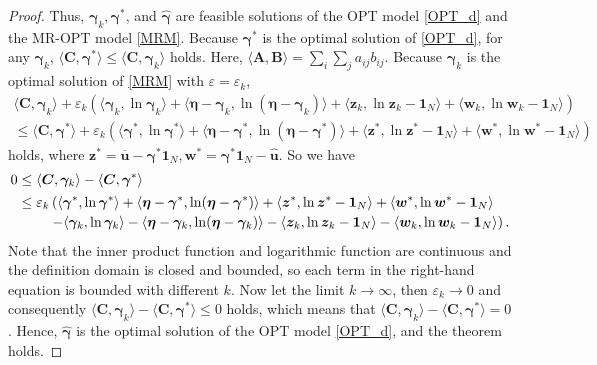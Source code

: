 \documentclass[10pt,a4paper]{amsart}
\begin{document}
\begin{proof}
 Thus, $\bm{\gamma}_{k}, \bm{\gamma}^*$, and $\hat{\bm{\gamma}}$ are feasible solutions of the OPT model \cref{OPT_d} and the MR-OPT model \cref{MRM}. Because $\bm{\gamma}^*$ is the optimal solution of  \cref{OPT_d}, for any $\bm{\gamma}_k$, $\langle \bm{C}, \bm{\gamma}^*\rangle \leq \langle \bm{C}, \bm{\gamma}_k \rangle$ holds. Here, $\langle \bm{A}, \bm{B} \rangle = \sum_i \sum_j a_{ij} b_{ij}$. 
 Because $\bm{\gamma}_k$ is the optimal solution of  \cref{MRM} with $\varepsilon=\varepsilon_k$, 
 \begin{multline*}
     \langle \bm{C}, \bm{\gamma}_k\rangle \! +\! \varepsilon_k(\langle \bm{\gamma}_k, \ln \bm{\gamma}_k \rangle\! +\!  \langle \bm{\eta}-\bm{\gamma}_k, \ln (\bm{\eta}-\bm{\gamma}_k) \rangle  
    \! +\! \langle \bm{z}_k, \ln \bm{z}_k -\bm{1}_N \rangle\! +\!  \langle \bm{w}_k, \ln \bm{w}_k -\bm{1}_N \rangle) \\
     \leq \langle \bm{C}, \bm{\gamma}^* \rangle\!  +\! \varepsilon_k(\langle \bm{\gamma}^*, \ln \bm{\gamma}^* \rangle\! +\! \langle \bm{\eta}-\bm{\gamma}^*, \ln (\bm{\eta}-\bm{\gamma}^*) \rangle  
     \! +\! \langle \bm{z}^*, \ln \bm{z}^* -\bm{1}_N \rangle\! +\! \langle \bm{w}^*, \ln \bm{w}^* -\bm{1}_N \rangle)
 \end{multline*}
 holds, where $\bm{z}^*=\bm{\overline{u}}-\bm{\gamma}^*\bm{1}_N, \bm{w}^*=\bm{\gamma}^* \bm{1}_N-\bm{\hat{u}}$.
 So we have
 \begin{equation*}
     \begin{aligned}
      0 & \leq \langle \bm{C}, \bm{\gamma}_k\rangle - \langle \bm{C}, \bm{\gamma}^* \rangle\\
     &
     \mathtoolsset{multlined-width=0.95\displaywidth}
     \begin{multlined}
         \leq \varepsilon_k \left(\langle \bm{\gamma}^*, \ln \bm{\gamma}^* \rangle+ \langle \bm{\eta}-\bm{\gamma}^*, \ln (\bm{\eta}-\bm{\gamma}^*) \rangle  + \langle \bm{z}^*, \ln \bm{z}^* -\bm{1}_N \rangle+ \langle \bm{w}^*, \ln \bm{w}^* -\bm{1}_N\rangle \right. \\
     \left. - \langle \bm{\gamma}_k, \ln \bm{\gamma}_k \rangle- \langle \bm{\eta}-\bm{\gamma}_k, \ln (\bm{\eta}-\bm{\gamma}_k) \rangle  -\langle \bm{z}_k, \ln \bm{z}_k -\bm{1}_N \rangle- \langle \bm{w}_k, \ln \bm{w}_k -\bm{1}_N \rangle  \right).
     \end{multlined}
     \end{aligned}
 \end{equation*}
 Note that the inner product function and logarithmic function are continuous and the definition domain is closed and bounded, so each term in the right-hand equation is bounded with different $k$. 
 Now let the limit $k\rightarrow \infty$, then $\varepsilon_k\rightarrow 0$ and consequently $\langle \bm{C}, \bm{\gamma}_k\rangle - \langle \bm{C}, \bm{\gamma}^* \rangle \leq 0$ holds, which means that $\langle \bm{C}, \bm{\gamma}_k\rangle - \langle \bm{C}, \bm{\gamma}^* \rangle = 0$. Hence, $\hat{\bm{\gamma}}$ is the optimal solution of the OPT model \cref{OPT_d}, and the theorem holds. 
\end{proof}
\end{document}
